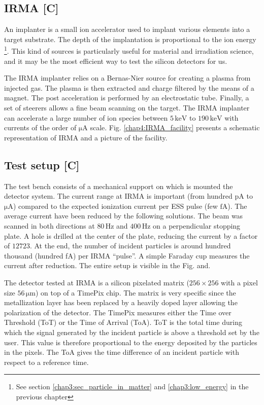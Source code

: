 \begin{refsection}
  \subsection{IRMA [C]}
  An implanter is a small ion accelerator used to implant various elements into a target substrate. The depth of the implantation is proportional to the ion energy \footnote{See section \ref{chap3:sec_particle_in_matter} and \ref{chap3:low_energy} in the previous chapter}. This kind of sources is particularly useful for material and irradiation science, and it may be the most efficient way to test the silicon detectors for us.

  The IRMA implanter \cite{Chaumont1981} relies on a Bernas-Nier source \cite{Paris1981} for creating a plasma from injected gas. The plasma is then extracted and charge filtered by the means of a magnet. The post acceleration is performed by an electrostatic tube. Finally, a set of steerers allows a fine beam scanning on the target. The IRMA implanter can accelerate a large number of ion species between $5 \,\mathrm{keV}$ to $190 \,\mathrm{keV}$ with currents of the order of $\mathrm{\mu A}$ scale. Fig. \ref{chap4:IRMA_facility} presents a schematic representation of IRMA and a picture of the facility.
  

  \subsection{Test setup [C]}

  The test bench consists of a mechanical support on which is mounted the detector system. The current range at IRMA is important (from hundred $\mathrm{pA}$ to $\mathrm{\mu A}$) compared to the expected ionization current per ESS pulse (few $\mathrm{fA}$). The average current have been reduced by the following solutions. The beam was scanned in both directions at $80 \,\mathrm{Hz}$ and $400\,\mathrm{Hz}$ on a perpendicular stopping plate. A hole is drilled at the center of the plate, reducing the current by a factor of $12723$. At the end, the number of incident particles is around hundred thousand (hundred fA) per IRMA “pulse”. A simple Faraday cup measures the current after reduction. The entire setup is visible in the Fig. and.

  The detector tested at IRMA is a silicon pixelated matrix ($256 \times 256$ with a pixel size $56\,\mathrm{\mu m}$) on top of a TimePix chip. The matrix is ​​very specific since the metallization layer has been replaced by a heavily doped layer allowing the polarization of the detector. The TimePix measures either the Time over Threshold (ToT) or the Time of Arrival (ToA). ToT is the total time during which the signal generated by the incident particle is above a threshold set by the user. This value is therefore proportional to the energy deposited by the particles in the pixels. The ToA gives the time difference of an incident particle with respect to a reference time.


\end{refsection}

